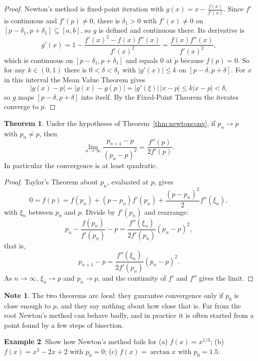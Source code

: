\documentclass[11pt,a4paper]{article}
\numberwithin{equation}{section}
\theoremstyle{definition}
\newtheorem{thm}{Theorem}[subsection]
\newtheorem{exa}[thm]{Example}
\newtheorem*{note}{Note}
\begin{document}
\begin{proof}
Newton's method is fixed-point iteration with $g(x) = x-\frac{f(x)}{f'(x)}$. Since $f'$ is continuous and $f'(p)\neq0$, there is
$\delta_1>0$ with $f'(x)\neq0$ on $[p-\delta_1,p+\delta_1]\subseteq[a,b]$, so $g$ is defined and continuous there. Its derivative is
$$g'(x) = 1-\frac{f'(x)^2-f(x)f''(x)}{f'(x)^2} = \frac{f(x)f''(x)}{f'(x)^2},$$
which is continuous on $[p-\delta_1,p+\delta_1]$ and equals $0$ at $p$ because $f(p) = 0$. So for any $k\in(0,1)$ there is $0<\delta<\delta_1$
with $|g'(x)|\leq k$ on $[p-\delta,p+\delta]$. For $x$ in this interval the Mean Value Theorem gives
$$|g(x)-p| = |g(x)-g(p)| = |g'(\xi)|\,|x-p|\leq k|x-p|<\delta,$$
so $g$ maps $[p-\delta,p+\delta]$ into itself. By the Fixed-Point Theorem the iterates converge to $p$.
\end{proof}

\begin{thm}
\label{thm:newtonquad}
Under the hypotheses of Theorem~\ref{thm:newtonconv}, if $p_n\longrightarrow p$ with $p_n\neq p$, then
$$\lim_{n\rightarrow\infty}\frac{p_{n+1}-p}{(p_n-p)^2} = \frac{f''(p)}{2f'(p)} .$$
In particular the convergence is at least quadratic.
\end{thm}

\begin{proof}
Taylor's Theorem about $p_n$, evaluated at $p$, gives
$$0 = f(p) = f(p_n)+(p-p_n)f'(p_n)+\frac{(p-p_n)^2}{2}f''(\xi_n),$$
with $\xi_n$ between $p_n$ and $p$. Divide by $f'(p_n)$ and rearrange:
$$p_n-\frac{f(p_n)}{f'(p_n)}-p = \frac{f''(\xi_n)}{2f'(p_n)}(p_n-p)^2,$$
that is,
$$p_{n+1}-p = \frac{f''(\xi_n)}{2f'(p_n)}(p_n-p)^2 .$$
As $n\longrightarrow\infty$, $\xi_n\longrightarrow p$ and $p_n\longrightarrow p$, and the continuity of $f'$ and $f''$ gives the limit.
\end{proof}

\begin{note}
The two theorems are \emph{local}: they guarantee convergence only if $p_0$ is close enough to $p$, and they say nothing about how close
that is. Far from the root Newton's method can behave badly, and in practice it is often started from a point found by a few steps of
bisection.
\end{note}

\begin{exa}
\label{exa:newtonfail}
Show how Newton's method fails for (a) $f(x) = x^{1/3}$; (b) $f(x) = x^3-2x+2$ with $p_0 = 0$; (c) $f(x) = \arctan x$ with $p_0 = 1.5$.
\end{exa}
\end{document}
